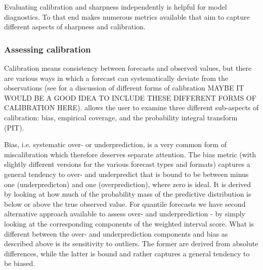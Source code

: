 \documentclass[article,shortnames]{jss}\usepackage[]{graphicx}\usepackage[]{color}
\begin{document}
Evaluating calibration and sharpness independently is helpful for model diagnostics. To that end  makes numerous metrics available that aim to capture different aspects of sharpness and calibration. 

\subsubsection{Assessing calibration} 

Calibration means consistency between forecasts and observed values, but there are various ways in which a forecast can systematically deviate from the observations (see \cite{gneitingProbabilisticForecastsCalibration2007} for a discussion of different forms of calibration MAYBE IT WOULD BE A GOOD IDEA TO INCLUDE THESE DIFFERENT FORMS OF CALIBRATION HERE).
 allows the user to examine three different sub-aspects of calibration: bias, empirical coverage, and the probability integral transform (PIT). 

Bias, i.e. systematic over- or underprediction, is a very common form of miscalibration which therefore deserves separate attention. The bias metric (with slightly different versions for the various forecast types and formats) captures a general tendency to over- and underpredict that is bound to be between minus one (underpredicton) and one (overprediction), where zero is ideal. It is derived by looking at how much of the probability mass of the predictive distribution is below or above the true observed value. For quantile forecasts we have second alternative approach available to assess over- and underprediction - by simply looking at the corresponding components of the weighted interval score. What is different between the over- and underprediction components and bias as described above is its sensitivity to outliers. The former are derived from absolute differences, while the latter is bound and rather captures a general tendency to be biased. 
\end{document}
